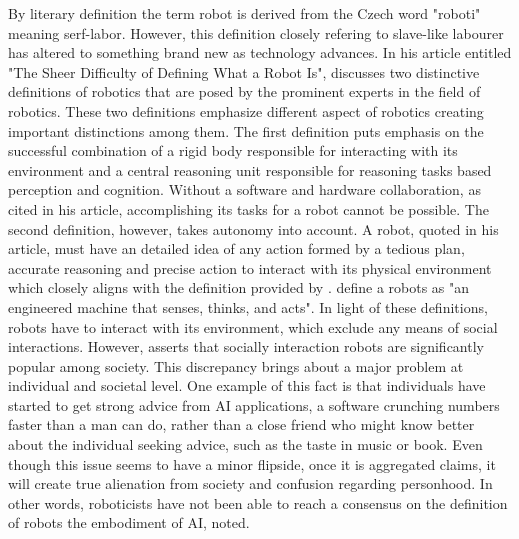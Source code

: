 \documentclass[man]{apa6}
\begin{document}
By literary definition the term robot is derived from the Czech word "roboti" meaning serf-labor. However, this definition closely refering to slave-like labourer has altered to something brand new as technology advances. In his article entitled "The Sheer Difficulty of Defining What a Robot Is",  discusses two distinctive definitions of robotics that are posed by the prominent experts in the field of robotics. These two definitions emphasize different aspect of robotics creating important distinctions among them. The first definition puts emphasis on the successful combination of a rigid body responsible for interacting with its environment and a central reasoning unit responsible for reasoning tasks based perception and cognition. Without a software and hardware collaboration, as  cited in his article, accomplishing its tasks for a robot cannot be possible.
The second definition, however, takes autonomy into account. A robot,  quoted in his article, must have an detailed idea of any action formed by a tedious plan, accurate reasoning and precise action to interact with its physical environment which closely aligns with the definition provided by \cite{lin}. \citeauthor{lin} \citeyear[p.~943]{lin} define a robots as "an engineered machine that senses, thinks, and acts". In light of these definitions, robots have to interact with its environment, which exclude any means of social interactions. However,  asserts that socially interaction robots are significantly popular among society. 
This discrepancy brings about a major problem at individual and societal level. One example of this fact is that individuals have started to get strong advice from AI applications, a software crunching numbers faster than a man can do, rather than a close friend who might know better about the individual seeking advice, such as the taste in music or book. Even though this issue seems to have a minor flipside, once it is aggregated  claims, it will create true alienation from society and confusion regarding personhood. In other words, roboticists have not been able  to reach a consensus on the definition of robots the embodiment of AI,  noted.\par
\end{document}
